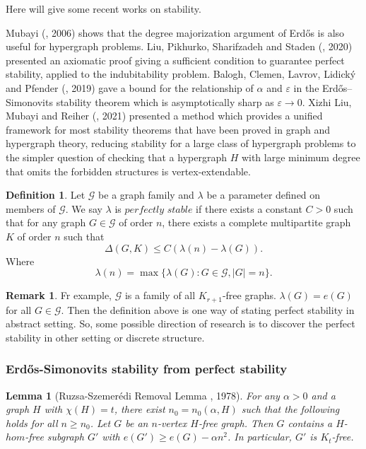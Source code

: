 \documentclass{article}
\newtheorem{lemma}[theorem]{Lemma}
\theoremstyle{definition}
\newtheorem{remark}[theorem]{Remark}
\newtheorem{definition}[theorem]{Definition}
\def\Erdos{Erd\H{o}s}
\renewcommand{\epsilon}{\varepsilon}
\begin{document}
Here will give some recent works on stability.

Mubayi (\cite{Mubayi2006AHE}, 2006) shows that the degree majorization argument of \Erdos{} is also useful for hypergraph problems.
Liu, Pikhurko, Sharifzadeh and Staden (\cite{Liu2020StabilityFG}, 2020) presented an  axiomatic proof giving a sufficient condition to guarantee perfect stability, applied to the indubitability problem. 
Balogh, Clemen, Lavrov, Lidick\'y and Pfender (\cite{Balogh2019MakingKG}, 2019) gave a bound for the relationship of $\alpha$ and $\epsilon$ in the \Erdos{}–Simonovits stability theorem which is asymptotically sharp as $\epsilon\to 0$.
Xizhi Liu, Mubayi and Reiher (\cite{Liu2021AUA}, 2021)  presented a method which provides a unified framework for most stability theorems that have been proved in graph and hypergraph theory, reducing stability for a large class of hypergraph problems to the simpler question of checking that a hypergraph $H$ with large minimum degree that omits the forbidden structures is vertex-extendable. 

\begin{definition}
    Let $\mathcal{G}$ be a graph family and $\lambda$ be a parameter defined on members of $\mathcal{G}$.
    We say $\lambda$ is $perfectly$ $stable$ if there exists a constant $C>0$ such that for any graph $G \in \mathcal{G}$ of order $n$, there exists a complete multipartite graph $K$ of order $n$ such that $$\Delta (G, K) \leq C(\lambda(n)-\lambda(G)).$$ 
    Where $$\lambda(n) = \max \{\lambda(G): G \in \mathcal{G}, |G|=n\}.$$
\end{definition}
\begin{remark}
    Fr example, $\mathcal{G}$ is a family of all $K_{r+1}$-free graphs. $\lambda(G) = e(G)$ for all $G \in \mathcal{G}$. Then the definition above is one way of stating perfect stability in abstract setting. So, some possible direction of research is to discover the perfect stability in other setting or discrete structure.
\end{remark}

\subsubsection{\Erdos{}-Simonovits stability from perfect stability}
\begin{lemma}[Ruzsa-Szemer\'edi Removal Lemma \cite{Ruzsa1978Triple}, 1978]\label{RS-Removal lemma}
For any $\alpha >0$ and a graph $H$ with $\chi(H)=t$, there exist $n_0=n_0(\alpha,H)$ such that the following holds for all $n\geq n_{0}$. 
Let $G$ be an $n$-vertex $H$-free graph.
Then $G$ contains a $H$-$hom$-free subgraph $G'$ with $e(G')\geq e(G)-\alpha n^{2}$. In particular, $G'$ is $K_t$-free.
\end{lemma}
\end{document}
